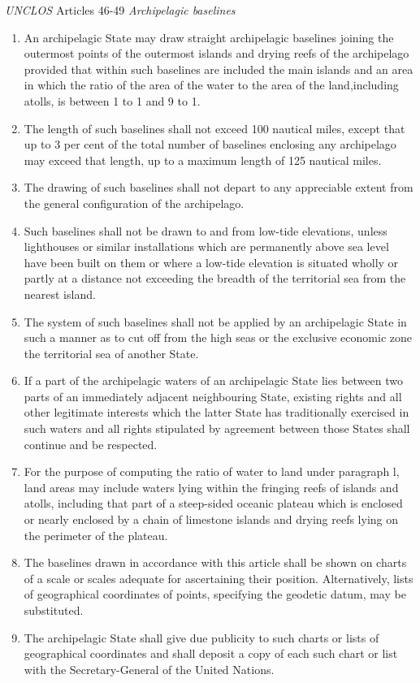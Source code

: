 \begin{conventiondetails}{\textit{UNCLOS} Articles 46-49}
    \textit{Archipelagic baselines}
    \begin{enumerate}
        \item An archipelagic State may draw straight archipelagic baselines joining the outermost points of the outermost islands and drying reefs of the archipelago provided that within such baselines are included the main islands and an area in which the ratio of the area of the water to the area of the land,including atolls, is between 1 to 1 and 9 to 1.
        \item The length of such baselines shall not exceed 100 nautical miles, except that up to 3 per cent of the total number of baselines enclosing any archipelago may exceed that length, up to a maximum length of 125 nautical miles.
        \item The drawing of such baselines shall not depart to any appreciable extent from the general configuration of the archipelago.
        \item Such baselines shall not be drawn to and from low-tide elevations, unless lighthouses or similar installations which are permanently above sea level have been built on them or where a low-tide elevation is situated wholly or partly at a distance not exceeding the breadth of the territorial sea from the nearest island.
        \item The system of such baselines shall not be applied by an archipelagic State in such a manner as to cut off from the high seas or the exclusive economic zone the territorial sea of another State.
        \item If a part of the archipelagic waters of an archipelagic State lies between two parts of an immediately adjacent neighbouring State, existing rights and all other legitimate interests which the latter State has traditionally exercised in such waters and all rights stipulated by agreement between those States shall continue and be respected.
        \item For the purpose of computing the ratio of water to land under paragraph l, land areas may include waters lying within the fringing reefs of islands and atolls, including that part of a steep-sided oceanic plateau which is enclosed or nearly enclosed by a chain of limestone islands and drying reefs lying on the perimeter of the plateau.
        \item The baselines drawn in accordance with this article shall be shown on charts of a scale or scales adequate for ascertaining their position. Alternatively, lists of geographical coordinates of points, specifying the geodetic datum, may be substituted.
        \item The archipelagic State shall give due publicity to such charts or lists of geographical coordinates and shall deposit a copy of each such chart or list with the Secretary-General of the United Nations.
    \end{enumerate}


\end{conventiondetails}
